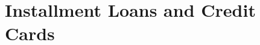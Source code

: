 \documentclass[9pt,letter,twoside,openright]{memoir}
\begin{document}
\section{Installment Loans and Credit Cards}

\end{document}
